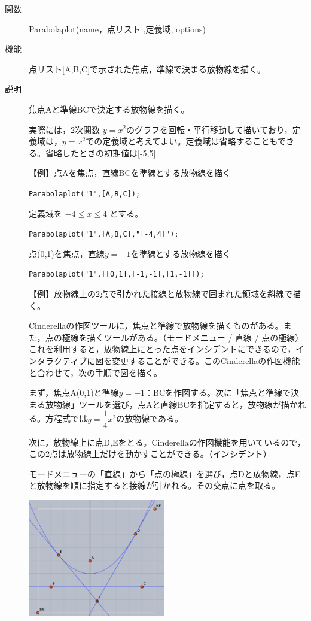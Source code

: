 \documentclass[papersize,a4paper,12pt,uplatex]{jsarticle}
\begin{document}
\begin{description}
\vspace{\baselineskip}
\hypertarget{parabolaplot}{}
\item[関数]Parabolaplot(name，点リスト ,定義域, options)
\item[機能]点リスト[A,B,C]で示された焦点，準線で決まる放物線を描く。
\item[説明]焦点Aと準線BCで決定する放物線を描く。

実際には，2次関数 $y=x^2$のグラフを回転・平行移動して描いており，定義域は，$y=x^2$での定義域と考えてよい。定義域は省略することもできる。省略したときの初期値は[-5,5]

\vspace{\baselineskip}
【例】点Aを焦点，直線BCを準線とする放物線を描く

\hspace{10mm}\verb|Parabolaplot("1",[A,B,C]); |

定義域を $-4 \leq x \leq 4$ とする。

\hspace{10mm} \verb|Parabolaplot("1",[A,B,C],"[-4,4]");|

点(0,1)を焦点，直線$y=-1$を準線とする放物線を描く

\hspace{10mm} \verb|Parabolaplot("1",[[0,1],[-1,-1],[1,-1]]);|

\vspace{\baselineskip}
【例】放物線上の2点で引かれた接線と放物線で囲まれた領域を斜線で描く。

Cinderellaの作図ツールに，焦点と準線で放物線を描くものがある。また，点の極線を描くツールがある。（モードメニュー / 直線 / 点の極線）これを利用すると，放物線上にとった点をインシデントにできるので，インタラクティブに図を変更することができる。このCinderellaの作図機能と合わせて，次の手順で図を描く。

まず，焦点A(0,1)と準線$y=-1$：BCを作図する。次に「焦点と準線で決まる放物線」ツールを選び，点Aと直線BCを指定すると，放物線が描かれる。方程式では$y=\dfrac{1}{4}x^2$の放物線である。

次に，放物線上に点D,Eをとる。Cinderellaの作図機能を用いているので，この2点は放物線上だけを動かすことができる。（インシデント）

モードメニューの「直線」から「点の極線」を選び，点Dと放物線，点Eと放物線を順に指定すると接線が引かれる。その交点に点を取る。

\vspace{\baselineskip}
\begin{center} \includegraphics[bb=0 0 482.02 413.02 , width=6cm]{Fig/parabolaplot.pdf} \end{center}


\end{description}
\end{document}
